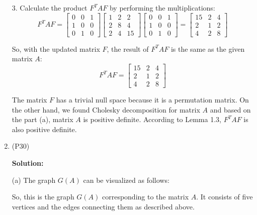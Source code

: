 \documentclass[12pt]{article}
\begin{document}
\begin{enumerate}[leftmargin=\labelsep]
3. Calculate the product $F^TAF$ by performing the multiplications:
\[
F^TAF = \begin{bmatrix}
0 & 0 & 1 \\
1 & 0 & 0 \\
0 & 1 & 0
\end{bmatrix}
\begin{bmatrix}
1 & 2 & 2 \\
2 & 8 & 4 \\
2 & 4 & 15
\end{bmatrix}
\begin{bmatrix}
0 & 0 & 1 \\
1 & 0 & 0 \\
0 & 1 & 0
\end{bmatrix}
=
\begin{bmatrix}
15 & 2 & 4 \\
2 & 1 & 2 \\
4 & 2 & 8
\end{bmatrix}
\]

So, with the updated matrix $F$, the result of $F^TAF$ is the same as the given matrix $A$:
\[
F^TAF =
\begin{bmatrix}
15 & 2 & 4 \\
2 & 1 & 2 \\
4 & 2 & 8
\end{bmatrix}
\]

The matrix 
$F$ has a trivial null space because it is a permutation matrix. On the other hand, we found Cholesky decomposition for matrix $A$ and based on the part (a), matrix $A$ is positive definite. According to Lemma 1.3, $F^TAF$ is also positive definite.

\newpage
\item (P30) 

\textbf{Solution:} 

(a) The graph $G(A)$ can be visualized as follows:

\begin{center}
\end{center}

So, this is the graph $G(A)$ corresponding to the matrix $A$. It consists of five vertices and the edges connecting them as described above.


\end{enumerate}
\end{document}
